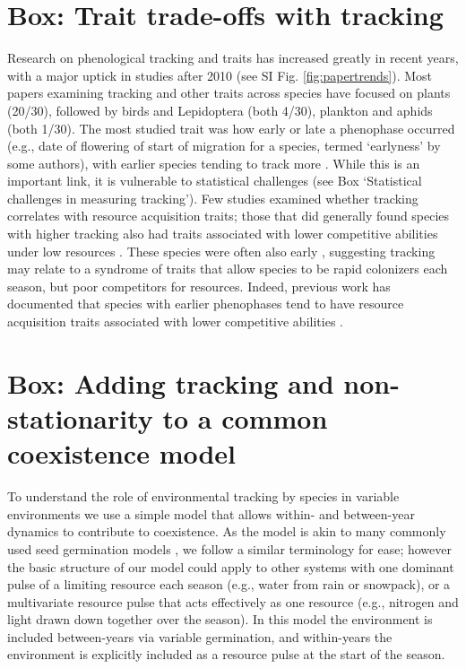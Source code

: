 \documentclass[11pt,letterpaper]{article}
\begin{document}
\section{Box: Trait trade-offs with tracking} %
Research on phenological tracking and traits has increased greatly in recent years, with a major uptick in studies after 2010 (see SI Fig. \ref{fig:papertrends}). Most papers examining tracking and other traits across species have focused on plants (20/30), followed by birds and Lepidoptera (both 4/30), plankton and aphids (both 1/30). The most studied trait was how early or late a phenophase occurred (e.g., date of flowering of start of migration for a species, termed `earlyness' by some authors), with earlier species tending to track more \citep[studies included both birds and Lepidotera,][]{Diamond:2011nx,Ishioka2013,kharouba2014,jing2016,du2017}. While this is an important link, it is vulnerable to statistical challenges (see Box `Statistical challenges in measuring tracking'). Few studies examined whether tracking correlates with resource acquisition traits; those that did generally found species with higher tracking also had traits associated with lower competitive abilities under low resources \citep[e.g., being shallower or lacking a taproot rooted][]{Dorji2013,lasky2016,Zhu2016BioLetters}. These species were often also early \citep[e.g.,][]{Dorji2013,Zhu2016BioLetters}, suggesting tracking may relate to a syndrome of traits that allow species to be rapid colonizers each season, but poor competitors for resources. Indeed, previous work has documented that species with earlier phenophases tend to have resource acquisition traits associated with lower competitive abilities \citep[e.g., they tend to be of lower height, have shallower roots, narrower diameter vessels, thinner leaves, and grow faster, reviewed in][]{wolkovich2014aob}. %

\section{Box: Adding tracking and non-stationarity to a common coexistence model} %
To understand the role of environmental tracking by species in variable environments we use a simple model that allows within- and between-year dynamics to contribute to coexistence. As the model is akin to many commonly used seed germination models \citep{Chesson:2004eo}, we follow a similar terminology for ease; however the basic structure of our model could apply to other systems with one dominant pulse of a limiting resource each season (e.g., water from rain or snowpack), or a multivariate resource pulse that acts effectively as one resource (e.g., nitrogen and light drawn down together over the season). In this model the environment is included between-years via variable germination, and within-years the environment is explicitly included as a resource pulse at the start of the season. 
\end{document}
